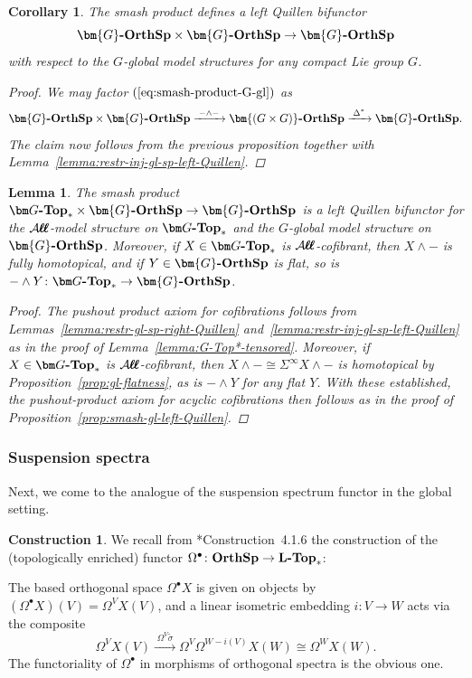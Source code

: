 \documentclass[reqno]{memo-l}
\theoremstyle{mythm}
\newtheorem{lemma}[thm]{Lemma}
\newtheorem{cor}[thm]{Corollary}
\theoremstyle{definition}
\newtheorem{constr}[thm]{Construction}
\numberwithin{equation}{section}
\newcommand{\Aa}{{\mathcal{A}}}
\newcommand{\cat}[1]{\textbf{\textup{#1}}}
\newcommand{\bigAll}{\hbox{\hfuzz=20pt\hbox{$\mathcal A\kern-.3pt$}\setbox0=\hbox{$\ell\kern-.75pt\ell$}\hbox to 0pt{\hfuzz=8pt\kern-.075pt\unhcopy0}\hbox to 0pt{\hfuzz=8pt\kern.075pt\unhcopy0}\box0\kern.05pt}}
\newcommand{\smallAll}{\Aa\kern-.3pt\ell\kern-.6pt\ell}
\newcommand{\All}{\mathchoice{\bigAll}{\bigAll}{\smallAll}{\smallAll}}
\let\smashp=\wedge
\newcommand{\osp}{{\textbf{\textup{OrthSp}}}}
\newcommand{\Gosp}[1]{\cat{$\bm{#1}$-OrthSp}}
\begin{document}
\begin{cor}\label{cor:smash-gl-left-Quillen}
    The smash product defines a left Quillen bifunctor 
    \begin{equation}\label{eq:smash-product-G-gl}
        \Gosp{G}\times\Gosp{G}\to\Gosp{G}
    \end{equation} 
    with respect to the $G$-global model structures for any compact Lie group $G$.
    \begin{proof}
        We may factor $(\ref{eq:smash-product-G-gl})$ as
        \[
            \Gosp{G}\times\Gosp{G}\xrightarrow{\;{-}\smashp{-}\;}\Gosp{(G\times G)}\xrightarrow{\;\Delta^*\;}\Gosp{G}.
        \]
        The claim now follows from the previous proposition together with Lemma~\ref{lemma:restr-inj-gl-sp-left-Quillen}.
    \end{proof}
\end{cor}

\begin{lemma}\label{lemma:G-global-spectra-tensoring}
    The smash product $\cat{$\bm G$-Top}_*\times\Gosp{G}\to\Gosp{G}$ is a left Quillen bifunctor for the $\All$-model structure on $\cat{$\bm G$-Top}_*$ and the $G$-global model structure on $\Gosp{G}$. Moreover, if $X\in\cat{$\bm G$-Top}_*$ is $\All$-cofibrant, then $X\smashp{-}$ is fully homotopical, and if $Y\in\Gosp{G}$ is flat, so is ${-}\smashp Y\colon\cat{$\bm G$-Top}_*\to\Gosp{G}$.
    \begin{proof}
        The pushout product axiom for cofibrations follows from Lemmas~\ref{lemma:restr-gl-sp-right-Quillen} and~\ref{lemma:restr-inj-gl-sp-left-Quillen} as in the proof of Lemma~\ref{lemma:G-Top*-tensored}. Moreover, if $X\in\cat{$\bm G$-Top}_*$ is $\All$-cofibrant, then $X\smashp{-}\cong\Sigma^\infty X\smashp{-}$ is homotopical by Proposition~\ref{prop:gl-flatness}, as is ${-}\smashp Y$ for any flat $Y$. With these established, the pushout-product axiom for acyclic cofibrations then follows as in the proof of Proposition~\ref{prop:smash-gl-left-Quillen}.
    \end{proof}
\end{lemma}

\subsubsection{Suspension spectra} Next, we come to the analogue of the suspension spectrum functor in the global setting.

\begin{constr}
    We recall from \cite{schwede2018global}*{Construction~4.1.6} the construction of the (topologically enriched) functor $\Omega^\bullet\colon\osp\to\cat{$\cat{L}$-Top}_*$:
    
    The based orthogonal space $\Omega^\bullet X$ is given on objects by $(\Omega^\bullet X)(V) =\Omega^VX(V)$, and a linear isometric embedding $i\colon V\to W$ acts via the composite
    \[
        \Omega^V X(V) \xrightarrow{\;\Omega^V\tilde\sigma\;}\Omega^V\Omega^{W-i(V)} X(W)\cong\Omega^WX(W).
    \]
    The functoriality of $\Omega^\bullet$ in morphisms of orthogonal spectra is the obvious one.
\end{constr}
\end{document}
